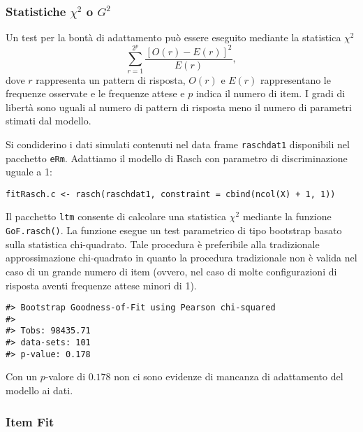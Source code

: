 \subsubsection{Statistiche $\chi^2$ o $G^2$}

Un test per la bontà di adattamento può essere eseguito mediante la statistica $\chi^2$ 
\begin{equation}
\sum_{r=1}^{2^p}\frac{ [O(r) - E(r)]^2 }{E(r)},
\end{equation}
dove $r$ rappresenta un pattern di risposta, $O(r)$ e $E(r)$ rappresentano le frequenze osservate e le frequenze attese e $p$ indica il numero di item. I gradi di libertà sono uguali al numero di pattern di risposta meno il numero di parametri stimati dal modello. 

\begin{exmp}
Si condiderino i dati simulati contenuti nel data frame {\tt raschdat1} disponibili nel pacchetto {\tt eRm}.  Adattiamo il modello di Rasch con parametro di discriminazione uguale a 1:
\begin{lstlisting}
fitRasch.c <- rasch(raschdat1, constraint = cbind(ncol(X) + 1, 1))
\end{lstlisting}
\noindent Il pacchetto {\tt ltm} consente di calcolare una statistica $\chi^2$ mediante la funzione {\tt GoF.rasch()}.  La funzione esegue un test parametrico di tipo bootstrap basato sulla statistica chi-quadrato.  Tale procedura è preferibile alla tradizionale approssimazione chi-quadrato in quanto la procedura tradizionale non è valida nel caso di un grande numero di item (ovvero, nel caso di molte configurazioni di risposta aventi frequenze attese minori di 1).
\begin{lstlisting}
#> Bootstrap Goodness-of-Fit using Pearson chi-squared
#> 
#> Tobs: 98435.71 
#> data-sets: 101 
#> p-value: 0.178 
\end{lstlisting}
Con un $p$-valore di $0.178$ non ci sono evidenze di mancanza di adattamento del modello ai dati.
\end{exmp}

\subsubsection{Item Fit}

